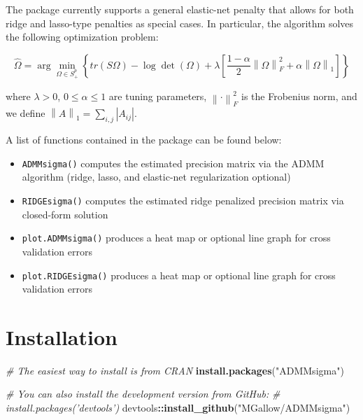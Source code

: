 \documentclass[11pt,]{report}
\newenvironment{Shaded}{\begin{snugshade}}{\end{snugshade}}
\newcommand{\CommentTok}[1]{\textcolor[rgb]{0.56,0.35,0.01}{\textit{#1}}}
\newcommand{\KeywordTok}[1]{\textcolor[rgb]{0.13,0.29,0.53}{\textbf{#1}}}
\newcommand{\NormalTok}[1]{#1}
\newcommand{\OperatorTok}[1]{\textcolor[rgb]{0.81,0.36,0.00}{\textbf{#1}}}
\newcommand{\StringTok}[1]{\textcolor[rgb]{0.31,0.60,0.02}{#1}}
\begin{document}
The package currently supports a general elastic-net penalty that allows for both ridge and lasso-type penalties as special cases. In particular, the algorithm solves the following optimization problem:

\[ \hat{\Omega} = \arg\min_{\Omega \in S_{+}^{p}}\left\{tr(S\Omega) - \log\det\left(\Omega\right) + \lambda\left[\frac{1 - \alpha}{2}\left\|\Omega\right\|_{F}^{2} + \alpha\left\|\Omega\right\|_{1} \right] \right\} \]

where \(\lambda > 0\), \(0 \leq \alpha \leq 1\) are tuning parameters, \(\left\|\cdot \right\|_{F}^{2}\) is the Frobenius norm, and we define \(\left\|A \right\|_{1} = \sum_{i, j} \left| A_{ij} \right|\).

A list of functions contained in the package can be found below:

\begin{itemize}
\item
  \texttt{ADMMsigma()} computes the estimated precision matrix via the ADMM algorithm (ridge, lasso, and elastic-net regularization optional)
\item
  \texttt{RIDGEsigma()} computes the estimated ridge penalized precision matrix via closed-form solution
\item
  \texttt{plot.ADMMsigma()} produces a heat map or optional line graph for cross validation errors
\item
  \texttt{plot.RIDGEsigma()} produces a heat map or optional line graph for cross validation errors
\end{itemize}

\hypertarget{installation}{%
\section{Installation}\label{installation}}

\begin{Shaded}
\begin{Highlighting}[]
\CommentTok{# The easiest way to install is from CRAN}
\KeywordTok{install.packages}\NormalTok{(}\StringTok{"ADMMsigma"}\NormalTok{)}

\CommentTok{# You can also install the development version from GitHub:}
\CommentTok{# install.packages('devtools')}
\NormalTok{devtools}\OperatorTok{::}\KeywordTok{install_github}\NormalTok{(}\StringTok{"MGallow/ADMMsigma"}\NormalTok{)}
\end{Highlighting}
\end{Shaded}

\vspace{0.5cm}
\end{document}
